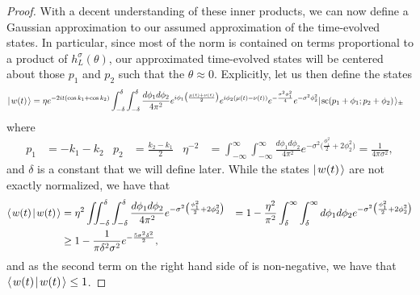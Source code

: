 \documentclass[../thesis-main/thesis-main]{subfiles}
\begin{document}
\begin{proof}
With a decent understanding of these inner products, we can now define a Gaussian approximation to our assumed approximation of the time-evolved states.  In particular, since most of the norm is contained on terms proportional to a product of $h_L^\sigma(\theta)$, our approximated time-evolved states will be centered about those $p_1$ and $p_2$ such that the $\theta \approx 0$.  Explicitly, let us then define the states
\begin{align}
  |\mspace{2mu} w(t) \mspace{2mu} \rangle &= \eta e^{ - 2 i t (\cos k_1 + \cos k_2)} \int_{-\delta}^\delta \int_{-\delta}^\delta \frac{d\phi_1 d\phi_2}{4\pi^2} e^{i \phi_1 \big(\frac{\mu(t) + \nu(t)}{2}\big)} e^{i  \phi_2 (\mu(t) - \nu(t))} e^{ -\frac{ \sigma^2 \phi_1^2}{4}} e^{ -\sigma^2 \phi_2^2} |\mspace{2mu} \text{sc}(p_1 + \phi_1; p_2 + \phi_2) \mspace{2mu} \rangle_{\pm}
\end{align} 
where
\begin{align}
p_1 &= - k_1 - k_2 & p_2 & = \frac{k_2 - k_1}{2} &
  \eta^{-2} &= \int_{-\infty}^\infty \int_{-\infty}^\infty \frac{d\phi_1 d\phi_2}{4\pi^2} e^{ -\sigma^2 \big(\frac{\phi_1^2}{2} + 2 \phi_2^2 \big)} = \frac{1}{4\pi\sigma^2},
\end{align}
and $\delta$ is a constant that we will define later.  While the states $|\mspace{2mu} w(t) \mspace{2mu} \rangle$ are not exactly normalized, we have that
\begin{align}
   \langle\mspace{2mu} w(t) \mspace{2mu} | \mspace{2mu} w(t)\mspace{2mu} \rangle &= \eta^2 \iint_{-\delta}^\delta \int_{-\delta}^\delta \frac{d\phi_1d\phi_2}{4\pi^2}  e^{ -\sigma^2 \big(\frac{\phi_1^2}{2} + 2 \phi_2^2 \big)} &= 1  - \frac{\eta^2}{\pi^2} \int_\delta^{\infty} \int_{\delta}^\infty d\phi_1d\phi_2 e^{ - \sigma^2 \big(\frac{\phi_1^2}{2} + 2 \phi_2^2\big)}\label{eq:w_norm}\\
   & \geq  1 - \frac{1}{\pi \delta^2 \sigma^2}e^{- \frac{5 \sigma^2 \delta^2}{2}},
\end{align}
and as the second term on the right hand side of  is non-negative, we have that $\langle\mspace{2mu} w(t) \mspace{2mu} | \mspace{2mu} w(t)\mspace{2mu} \rangle \leq 1$.



\end{proof}
\end{document}
